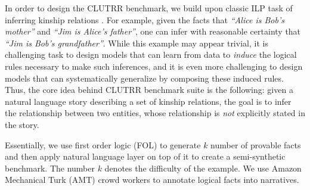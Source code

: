 \documentclass[12pt]{article}
\begin{document}
In order to design the CLUTRR benchmark, we build upon classic ILP task of inferring kinship relations \cite{hinton1986learning,muggleton1991inductive}. For example, given the facts that \textit{``Alice is Bob's mother''} and \textit{``Jim is Alice's father''}, one can infer with reasonable certainty that \textit{``Jim is Bob's grandfather''}. While this example may appear trivial, it is challenging task to design models that can learn from data to \textit{induce} the logical rules necessary to make such inferences, and it is even more challenging to design models that can systematically generalize by composing these induced rules. Thus, the core idea behind CLUTRR benchmark suite is the following: given a natural language story describing a set of kinship relations, the goal is to infer the relationship between two entities, whose relationship is \textit{not} explicitly stated in the story.

Essentially, we use first order logic (FOL) to generate $k$ number of provable facts and then apply natural language layer on top of it to create a semi-synthetic benchmark. The number $k$ denotes the difficulty of the example. We use Amazon Mechanical Turk (AMT) crowd workers to annotate logical facts into narratives.




\end{document}
